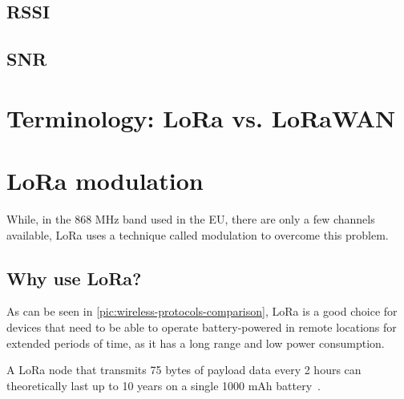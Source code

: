 \subsection{\acf{RSSI}}


\subsection{\acf{SNR}}


\section{Terminology: \acs{LoRa} vs. \acs{LoRaWAN}}


\section{\acf{LoRa} modulation}

While, in the 868 MHz band used in the \ac{EU}, there are only a few channels available, \ac{LoRa} uses a technique called modulation to overcome this problem.



\subsection{Why use \acs{LoRa}?}

As can be seen in \cref{pic:wireless-protocols-comparison}, \ac{LoRa} is a good choice for devices that need to be able to operate battery-powered in remote locations for extended periods of time, as it has a long range and low power consumption.

A \ac{LoRa} node that transmits 75 bytes of payload data every 2 hours can theoretically last up to 10 years on a single 1000 mAh battery~\cite{cheong_comparison_2017-1}.


